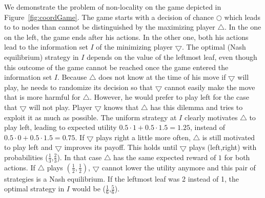 \documentclass{aamas2015}
\begin{document}
We demonstrate the problem of non-locality on the game depicted in Figure~\ref{fig:coordGame}. The game starts with a decision of chance $\bigcirc$ which leads to to nodes than cannot be distinguished by the maximizing player $\bigtriangleup$. In the one on the left, the game ends after his actions. In the other one, both his actions lead to the information set $I$ of the minimizing player $\bigtriangledown$.
The optimal (Nash equilibrium) strategy in $I$ depends on the value of the leftmost leaf, even though this outcome of the game cannot be reached once the game entered the information set $I$.
Because $\bigtriangleup$ does not know at the time of his move if $\bigtriangledown$ will play, he needs to randomize its decision so that $\bigtriangledown$ cannot easily make the move that is more harmful for $\bigtriangleup$. However, he would prefer to play left for the case that $\bigtriangledown$ will not play. Player $\bigtriangledown$ knows that $\bigtriangleup$ has this dilemma and tries to exploit it as much as possible. The uniform strategy at $I$ clearly motivates $\bigtriangleup$ to play left, leading to expected utility $0.5\cdot 1 + 0.5\cdot1.5 = 1.25$, instead of $0.5\cdot 0 + 0.5\cdot1.5 = 0.75$. If $\bigtriangledown$ plays right a little more often, $\bigtriangleup$ is still motivated to play left and $\bigtriangledown$ improves its payoff. This holds until $\bigtriangledown$ plays (left,right) with probabilities ($\frac{1}{3}$,$\frac{2}{3}$). In that case $\bigtriangleup$ has the same expected reward of $1$ for both actions. If $\bigtriangleup$ plays $(\frac{1}{2},\frac{1}{2})$, $\bigtriangledown$ cannot lower the utility anymore and this pair of strategies is a Nash equilibrium. If the leftmost leaf was 2 instead of 1, the optimal strategy in $I$ would be ($\frac{1}{6}$,$\frac{5}{6}$).

\end{document}

